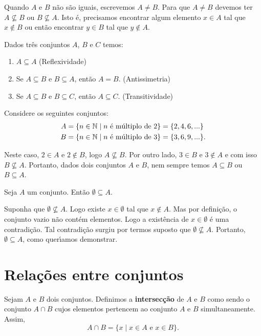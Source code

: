Quando $A$ e $B$ n{\~a}o s{\~a}o iguais, escrevemos $A \neq B$. Para que $A \neq B$ devemos ter $A \nsubseteq B$ ou $B \nsubseteq A$. Isto é, precisamos encontrar algum elemento $x \in A$ tal que $x \notin B$ ou então encontrar $y \in B$ tal que $y \notin A$.

\begin{proposicao}
	Dados três conjuntos $A$, $B$ e $C$ temos:
	\begin{enumerate}[label={\roman*})]
		\item $A\subseteq A$ (Reflexividade)
		\item Se $A\subseteq B \mbox{ e } B\subseteq A$, ent{\~a}o $A=B$. (Antissimetria)
		\item Se $A\subseteq B$ e $B\subseteq C$, ent{\~a}o $A\subseteq C$. (Transitividade)
	\end{enumerate}
\end{proposicao}


Considere os seguintes conjuntos:
\begin{align*}
	A &= \{ n \in \mathbb{N} \mid n \mbox{ {\'e} m{\'u}ltiplo de } 2\} = \{2,4,6,...\}\\
	B &= \{n \in \mathbb{N} \mid n \mbox{ {\'e} m{\'u}ltiplo de } 3\} = \{3,6,9,...\}.
\end{align*}


Neste caso, $2 \in A$ e $2 \notin B$, logo $A \nsubseteq B$. Por outro lado, $3 \in B$ e $3 \notin A$ e com isso $B \nsubseteq A$. Portanto, dados dois conjuntos $A$ e $B$, nem sempre temos $A \subseteq B$ ou $B \subseteq A$.

\begin{proposicao} 
	Seja $A$ um conjunto. Ent{\~a}o $ \emptyset \subseteq A$.
\end{proposicao}
\begin{prova}
	Suponha que $\emptyset \nsubseteq A$. Logo existe $x \in \emptyset$ tal que $x \notin A$. Mas por defini{\c c}{\~a}o, o conjunto vazio n{\~a}o cont{\'e}m elementos. Logo a exist\^encia de $x \in \emptyset$ {\'e} uma contradi{\c c}{\~a}o. Tal contradi\c{c}\~ao surgiu por termos suposto que $\emptyset \nsubseteq A$. Portanto, $\emptyset \subseteq A$, como quer{\'\i}amos demonstrar.
\end{prova}

\section{Rela{\c c}{\~o}es entre conjuntos}

\begin{definicao}\label{intersecao_conjunto}
Sejam $A$ e $B$ dois conjuntos. Definimos a \textbf{intersec{\c c}{\~a}o} de $A$ e $B$ como sendo o conjunto $A \cap B$ cujos elementos pertencem ao conjunto $A$ e $B$ simultaneamente. Assim,
\[
A \cap B = \{x \mid x \in A\mbox{ e }  x \in B\}.
\]
\end{definicao}

